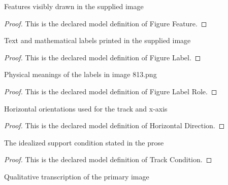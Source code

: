 \begin{definition}
  \label{def:physics:phyx-mini-0813:phyxminiproblems-problemphyxmini0813-figurefeature}
  Features visibly drawn in the supplied image
\end{definition}
\begin{proof}
  This is the declared model definition of Figure Feature.
\end{proof}
\begin{definition}
  \label{def:physics:phyx-mini-0813:phyxminiproblems-problemphyxmini0813-figurelabel}
  Text and mathematical labels printed in the supplied image
\end{definition}
\begin{proof}
  This is the declared model definition of Figure Label.
\end{proof}
\begin{definition}
  \label{def:physics:phyx-mini-0813:phyxminiproblems-problemphyxmini0813-figurelabelrole}
  Physical meanings of the labels in image 813.png
\end{definition}
\begin{proof}
  This is the declared model definition of Figure Label Role.
\end{proof}
\begin{definition}
  \label{def:physics:phyx-mini-0813:phyxminiproblems-problemphyxmini0813-horizontaldirection}
  Horizontal orientations used for the track and x-axis
\end{definition}
\begin{proof}
  This is the declared model definition of Horizontal Direction.
\end{proof}
\begin{definition}
  \label{def:physics:phyx-mini-0813:phyxminiproblems-problemphyxmini0813-trackcondition}
  The idealized support condition stated in the prose
\end{definition}
\begin{proof}
  This is the declared model definition of Track Condition.
\end{proof}
\begin{definition}
  \label{def:physics:phyx-mini-0813:phyxminiproblems-problemphyxmini0813-gliderspringfigure}
  Qualitative transcription of the primary image
\end{definition}
